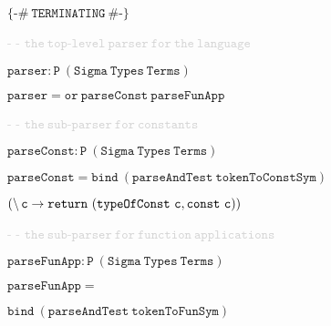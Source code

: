 \vspace{0.25cm}

\hspace{0.5cm}
{\small{$\mathtt{\{\text{-}\# ~TERMINATING~ \#\text{-}\}}$}}

\vspace{0.25cm}

\hspace{0.5cm}
{\small{\textcolor{lightgray}{- - $\mathtt{the ~top\text{-}level ~parser ~for ~the ~language}$}}}

\hspace{0.5cm}
{\small{$\mathtt{parser : P ~(Sigma ~Types ~Terms)}$}}

\hspace{0.5cm}
{\small{$\mathtt{parser = or ~parseConst ~parseFunApp}$}}

\vspace{0.25cm}

\hspace{0.5cm}
{\small{\textcolor{lightgray}{- - $\mathtt{the ~sub\text{-}parser ~for ~constants}$}}}

\hspace{0.5cm}
{\small{$\mathtt{parseConst : P ~(Sigma ~Types ~Terms)}$}}

\hspace{0.5cm}
{\small{$\mathtt{parseConst = bind ~(parseAndTest ~tokenToConstSym)}$}}

\vspace{-0.1cm}

\hspace{3.9cm}
{\small{$\mathtt{(\char`\\ \, c \to return ~(typeOfConst ~c , const ~c))}$}}

\newpage

\hspace{0.5cm}
{\small{\textcolor{lightgray}{- - $\mathtt{the ~sub\text{-}parser ~for ~function ~applications}$}}}

\hspace{0.5cm}
{\small{$\mathtt{parseFunApp : P ~(Sigma ~Types ~Terms)}$}}

\hspace{0.5cm}
{\small{$\mathtt{parseFunApp =}$}}

\vspace{-0.1cm}

\hspace{0.75cm}
{\small{$\mathtt{bind ~(parseAndTest ~tokenToFunSym)}$}}

\vspace{-0.1cm}

